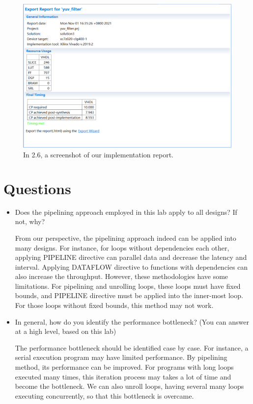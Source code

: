 \documentclass[a4paper]{article}
\begin{document}
\begin{figure}[H]
    \centering
    \includegraphics[width=1\textwidth]{7.png}
    \caption{In 2.6, a screenshot of our implementation report.}
\end{figure}
\section{Questions}
\begin{itemize}
    \item Does the pipelining approach employed in this lab apply to all designs? If not, why?
    
    From our perspective, the pipelining approach indeed can be applied into many designs. For instance, for loops without dependencies each other, applying PIPELINE directive can parallel data and decrease the latency and interval. Applying DATAFLOW directive to functions with dependencies can also increase the throughput. However, these methodologies have some limitations. For pipelining and unrolling loops, these loops must have fixed bounds, and PIPELINE directive must be applied into the inner-most loop. For those loops without fixed bounds, this method may not work.
    
    \item In general, how do you identify the performance bottleneck? (You can answer at a high level, based on this lab)
    
    The performance bottleneck should be identified case by case. For instance, a serial execution program may have limited performance. By pipelining method, its performance can be improved. For programs with long loops executed many times, this iteration process may takes a lot of time and become the bottleneck. We can also unroll loops, having several many loops executing concurrently, so that this bottleneck is overcame.
\end{itemize}
\end{document}
